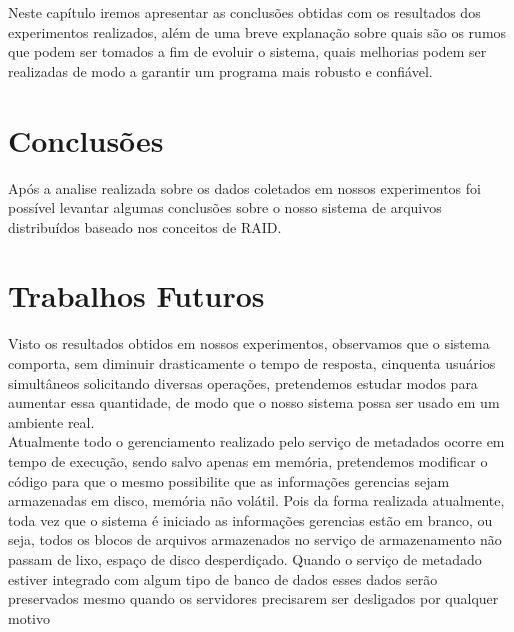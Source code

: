 Neste capítulo iremos apresentar as conclusões obtidas com os resultados dos experimentos realizados, além de uma breve explanação sobre quais são os rumos que podem ser tomados a fim de evoluir o sistema, quais melhorias podem ser realizadas de modo a garantir um programa mais robusto e confiável.
\\

\section{Conclusões}
Após a analise realizada sobre os dados coletados em nossos experimentos foi possível levantar algumas conclusões sobre o nosso sistema de arquivos distribuídos baseado nos conceitos de RAID.

\section{Trabalhos Futuros}
Visto os resultados obtidos em nossos experimentos, observamos que o sistema comporta, sem diminuir drasticamente o tempo de resposta, cinquenta usuários simultâneos  solicitando diversas operações, pretendemos estudar modos para aumentar essa quantidade, de modo que o nosso sistema possa ser usado em um ambiente real.
\\

Atualmente todo o gerenciamento realizado pelo serviço de metadados ocorre em tempo de execução, sendo salvo apenas em memória, pretendemos modificar o código para que o mesmo possibilite que as informações gerencias sejam armazenadas em disco, memória não volátil. Pois da forma realizada atualmente, toda vez que o sistema é iniciado as informações gerencias estão em branco, ou seja, todos os blocos de arquivos armazenados no serviço de armazenamento não passam de lixo, espaço de disco desperdiçado. Quando o serviço de metadado estiver integrado com algum tipo de banco de dados esses dados serão preservados mesmo quando os servidores precisarem ser desligados por qualquer motivo
\\

